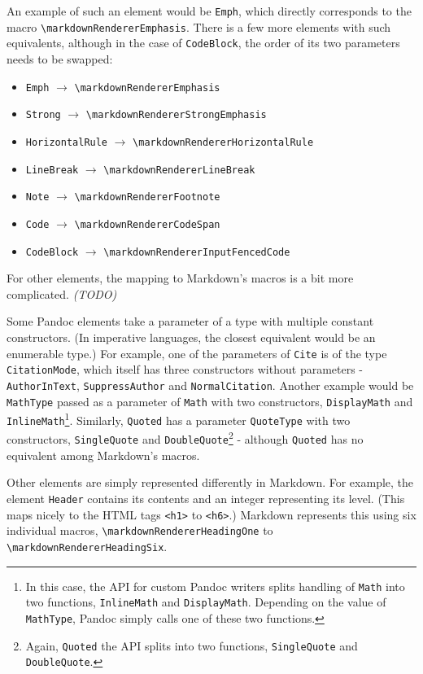 \documentclass[
  digital,     %
  oneside,     %
  nosansbold,  %
  nocolorbold, %
  lof,         %
  lot,         %
]{fithesis4}
\newcommand{\renderer}[1]{\texttt{\textbackslash{}markdownRenderer{#1}}}
\begin{document}
An example of such an element would be \texttt{Emph}, which directly corresponds to the macro \renderer{Emphasis}. There is a few more elements with such equivalents, although in the case of \texttt{CodeBlock}, the order of its two parameters needs to be swapped:

\begin{itemize}
\item \texttt{Emph} $\rightarrow$ \renderer{Emphasis}
\item \texttt{Strong} $\rightarrow$ \renderer{StrongEmphasis}
\item \texttt{HorizontalRule} $\rightarrow$ \renderer{HorizontalRule}
\item \texttt{LineBreak} $\rightarrow$ \renderer{LineBreak}
\item \texttt{Note} $\rightarrow$ \renderer{Footnote}
\item \texttt{Code} $\rightarrow$ \renderer{CodeSpan}
\item \texttt{CodeBlock} $\rightarrow$ \renderer{InputFencedCode}
\end{itemize}

For other elements, the mapping to Markdown's macros is a bit more complicated. \emph{(TODO)}

Some Pandoc elements take a parameter of a type with multiple constant constructors. (In imperative languages, the closest equivalent would be an enumerable type.) For example, one of the parameters of \texttt{Cite} is of the type \texttt{CitationMode}, which itself has three constructors without parameters - \texttt{AuthorInText}, \texttt{SuppressAuthor} and \texttt{NormalCitation}. Another example would be \texttt{MathType} passed as a parameter of \texttt{Math} with two constructors, \texttt{DisplayMath} and \texttt{InlineMath}\footnote{In this case, the API for custom Pandoc writers splits handling of \texttt{Math} into two functions, \texttt{InlineMath} and \texttt{DisplayMath}. Depending on the value of \texttt{MathType}, Pandoc simply calls one of these two functions.}. Similarly, \texttt{Quoted} has a parameter \texttt{QuoteType} with two constructors, \texttt{SingleQuote} and \texttt{DoubleQuote}\footnote{Again, \texttt{Quoted} the API splits into two functions, \texttt{SingleQuote} and \texttt{DoubleQuote}.} - although \texttt{Quoted} has no equivalent among Markdown's macros.

Other elements are simply represented differently in Markdown. For example, the element \texttt{Header} contains its contents and an integer representing its level. (This maps nicely to the HTML tags \texttt{<h1>} to \texttt{<h6>}.) Markdown represents this using six individual macros, \renderer{HeadingOne} to \renderer{HeadingSix}.
\end{document}
